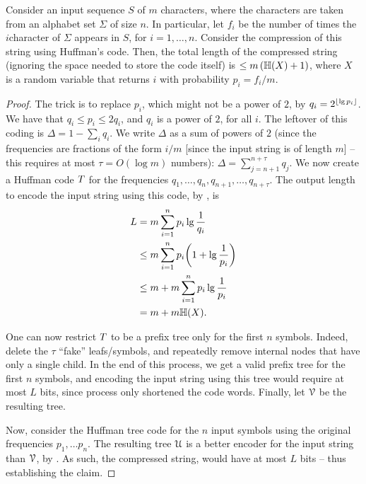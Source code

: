 \begin{theorem}
    Consider an input sequence $S$ of $m$ characters, where the
    characters are taken from an alphabet set $\Sigma$ of size $n$. In
    particular, let $f_i$ be the number of times the $i$\th character
    of $\Sigma$ appears in $S$, for $i=1,\ldots, n$. Consider the
    compression of this string using Huffman's code. Then, the total
    length of the compressed string (ignoring the space needed to
    store the code itself) is $\leq m \,(\Entropy{X} + 1)$, where $X$
    is a random variable that returns $i$ with probability
    $p_i = f_i/m$.
\end{theorem}
\begin{proof}
    The trick is to replace $p_i$, which might not be a power of $2$,
    by $q_i = 2^{\left\lfloor {\lg p_i } \right\rfloor}$. We have that
    $q_i \leq p_i \leq 2q_i$, and $q_i$ is a power of $2$, for all
    $i$. The leftover of this coding is $\Delta = 1 - \sum_i q_i$. We
    write $\Delta$ as a sum of powers of $2$ (since the frequencies
    are fractions of the form $i/m$ [since the input string is of
    length $m$] -- this requires at most $\tau = O(\log m)$ numbers):
    $\Delta = \sum_{j=n+1}^{n+\tau}q_j$. We now create a Huffman code
    $T$ for the frequencies
    ${q_1, \ldots, q_n, q_{n+1}, \ldots, q_{n+\tau}}$. The output
    length to encode the input string using this code, by
    , is
    \begin{align*}
        L%
        &=%
        m \sum_{i=1}^n p_i \lg \frac{1}{q_i}
        \\&\leq %
        m \sum_{i=1}^n p_i \pth{ 1 + \lg \frac{1}{p_i}}
        \\&\leq %
        m + m \sum_{i=1}^n p_i  \lg \frac{1}{p_i}%
        \\&=%
        m + m \EntropyX{X}.
    \end{align*}

    One can now restrict $T$ to be a prefix tree only for the
    first $n$ symbols. Indeed, delete the $\tau$ ``fake''
    leafs/symbols, and repeatedly remove internal nodes that have only
    a single child. In the end of this process, we get a valid prefix
    tree for the first $n$ symbols, and encoding the input string
    using this tree would require at most $L$ bits, since process only
    shortened the code words. Finally, let $\EuScript{V}$ be the resulting
    tree.

    Now, consider the Huffman tree code for the $n$ input symbols
    using the original frequencies $p_1,\ldots p_n$. The resulting
    tree $\EuScript{U}$ is a better encoder for the input string than
    $\EuScript{V}$, by . As such, the compressed
    string, would have at most $L$ bits -- thus establishing the
    claim.
\end{proof}




